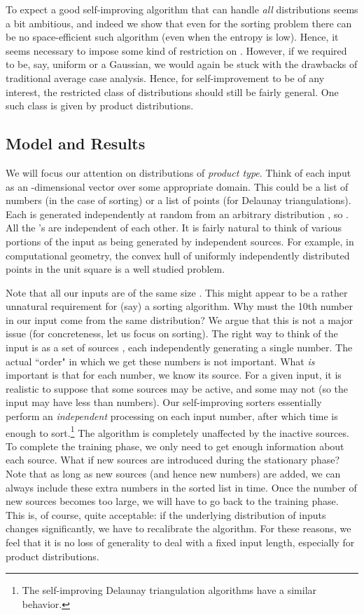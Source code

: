 \documentclass{siamltex}
\begin{document}
To expect a good self-improving algorithm that can  handle \emph{all}
distributions  seems a bit ambitious, and indeed we show that
even for the sorting problem there can be no space-efficient such 
algorithm (even when the entropy is low).  Hence, it seems
necessary to impose some kind of restriction on . However,
if we required  to be, say, uniform or a Gaussian, we would again
be stuck with the drawbacks of traditional average case analysis.
Hence, for self-improvement to be of any interest, the restricted
class of distributions should still be fairly general. One such class
is given by product distributions. 



\subsection{Model and Results}



We will focus our attention on distributions  of 
\emph{product type}.
Think of each input as an -dimensional vector  over
some appropriate domain. This could be a list of numbers (in the case of
sorting) or a list of points (for Delaunay triangulations). Each 
is generated independently at random from an arbitrary distribution ,
so .
All the 's are independent of each other. It is fairly natural
to think of various portions of the input as being generated by independent
sources. For example, in computational geometry, the convex hull of uniformly 
independently distributed points in the unit square is a well studied problem.

Note that all our inputs are of the same size . This might appear
to be a rather unnatural requirement for (say) a sorting algorithm.
Why must the 10th number in our input come from the same distribution?
We argue that this is not a major issue (for concreteness,
let us focus on sorting). The right way to think
of the input is as a set of sources ,
each independently generating a single number. The actual ``order"
in which we get these numbers is not important. What \emph{is} important
is that for each number, we know its source. For a given input,
it is realistic to suppose that some sources may be active,
and some may not (so the input may have less than  numbers).
Our self-improving sorters essentially perform an \emph{independent}
processing on each input number, after which  time is enough
to sort.\footnote{The self-improving Delaunay triangulation algorithms
have a similar behavior.} The algorithm is completely unaffected by the 
inactive sources. To complete the training phase, we only need to get
enough information about each source. 
What if new sources are introduced during the stationary
phase? Note that as long as  new sources (and hence
new numbers) are added, we can always include these extra numbers
in the sorted list in  time. Once the number of new sources
becomes too large, we will have to go back to the training phase. This
is, of course, quite acceptable: if the underlying distribution
of inputs changes significantly, we have to recalibrate
the algorithm. For these reasons, we feel that it is no loss
of generality to deal with a fixed input length, especially
for product distributions.
\end{document}
